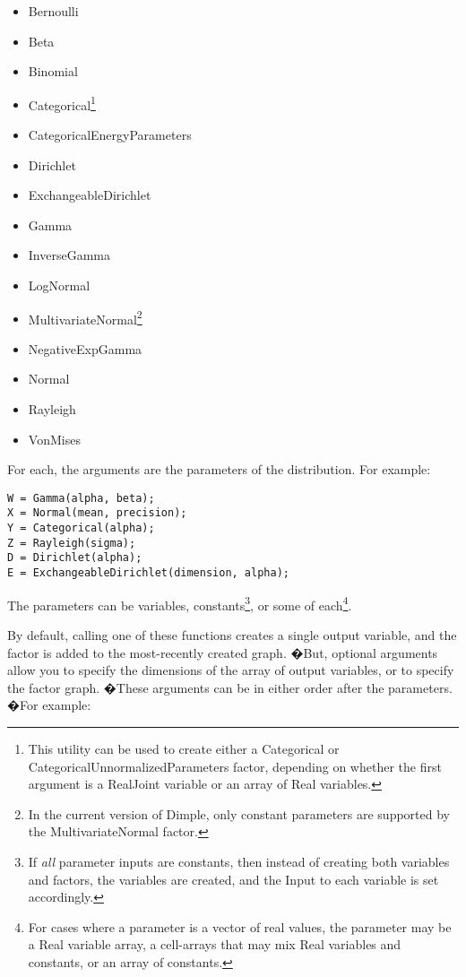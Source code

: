 \begin{itemize}
\item Bernoulli
\item Beta
\item Binomial
\item Categorical\footnote{This utility can be used to create either a Categorical or CategoricalUnnormalizedParameters factor, depending on whether the first argument is a RealJoint variable or an array of Real variables.}
\item CategoricalEnergyParameters
\item Dirichlet
\item ExchangeableDirichlet
\item Gamma
\item InverseGamma
\item LogNormal
\item MultivariateNormal\footnote{In the current version of Dimple, only constant parameters are supported by the MultivariateNormal factor.}
\item NegativeExpGamma
\item Normal
\item Rayleigh
\item VonMises
\end{itemize}

For each, the arguments are the parameters of the distribution.  For example:

\begin{lstlisting}
W = Gamma(alpha, beta);
X = Normal(mean, precision);
Y = Categorical(alpha);
Z = Rayleigh(sigma);
D = Dirichlet(alpha);
E = ExchangeableDirichlet(dimension, alpha);
\end{lstlisting}


The parameters can be variables, constants\footnote{If \emph{all} parameter inputs are constants, then instead of creating both variables and factors, the variables are created, and the Input to each variable is set accordingly.}, or some of each\footnote{For cases where a parameter is a vector of real values, the parameter may be a Real variable array, a cell-arrays that may mix Real variables and constants, or an array of constants.}.

By default, calling one of these functions creates a single output variable, and the factor is added to the most-recently created graph. �But, optional arguments allow you to specify the dimensions of the array of output variables, or to specify the factor graph. �These arguments can be in either order after the parameters. �For example:

